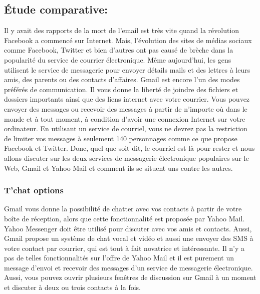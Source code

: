 \documentclass[french]{report}
\begin{document}
\begin{titlepage}
\section{\LARGE Étude comparative:}
\LARGE Il y avait des rapports de la mort de l'email est très vite quand la révolution Facebook a commencé sur Internet. Mais, l'évolution des sites de médias sociaux comme Facebook, Twitter et bien d'autres ont pas causé de brèche dans la popularité du service de courrier électronique. Même aujourd'hui, les gens utilisent le service de messagerie pour envoyer détails mails et des lettres à leurs amis, des parents ou des contacts d'affaires. Gmail est encore l'un des modes préférés de communication. Il vous donne la liberté de joindre des fichiers et dossiers importants ainsi que des liens internet avec votre courrier. Vous pouvez envoyer des messages ou recevoir des messages à partir de n'importe où dans le monde et à tout moment, à condition d'avoir une connexion Internet sur votre ordinateur. En utilisant un service de courriel, vous ne devrez pas la restriction de limiter vos messages à seulement 140 personnages comme ce que propose Facebook et Twitter. Donc, quel que soit dit, le courriel est là pour rester et nous allons discuter sur les deux services de messagerie électronique populaires sur le Web, Gmail et Yahoo Mail et comment ils se situent uns contre les autres.
\subsubsection{\LARGE T'chat options}
\LARGE Gmail vous donne la possibilité de chatter avec vos contacts à partir de votre boîte de réception, alors que cette fonctionnalité est proposée par Yahoo Mail. Yahoo Messenger doit être utilisé pour discuter avec vos amis et contacts. Aussi, Gmail propose un système de chat vocal et vidéo et aussi une envoyer des SMS à votre contact par courrier, qui est tout à fait novatrice et intéressante. Il n'y a pas de telles fonctionnalités sur l'offre de Yahoo Mail et il est purement un message d'envoi et recevoir des messages d'un service de messagerie électronique. Aussi, vous pouvez ouvrir plusieurs fenêtres de discussion sur Gmail à un moment et discuter à deux ou trois contacts à la fois.
\newpage

\end{titlepage}
\end{document}
